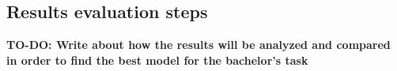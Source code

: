 \subsection{Results evaluation steps}
\textbf{TO-DO: Write about how the results will be analyzed and compared in order to find the best model for the bachelor's task}